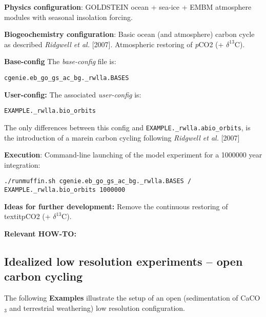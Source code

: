 \documentclass[10pt,twoside]{article}
\begin{document}
\noindent \textbf{Physics configuration}: GOLDSTEIN ocean + sea-ice + EMBM atmosphere modules with seasonal insolation forcing.

\noindent \textbf{Biogeochemistry configuration}: Basic ocean (and atmosphere) carbon cycle as described \textit{Ridgwell et al.} [2007]. Atmospheric restoring of \textit{p}CO2 (+ $\delta^{13}$C).

\noindent \textbf{Base-config} The \textit{base-config} file is:
\vspace{-10pt}\begin{verbatim}cgenie.eb_go_gs_ac_bg._rwlla.BASES\end{verbatim}\vspace{-10pt}

\noindent \textbf{User-config:} The associated \textit{user-config} is:
\vspace{-10pt}\begin{verbatim}EXAMPLE._rwlla.bio_orbits\end{verbatim}\vspace{-10pt}
The only differences between this config and \texttt{EXAMPLE.\_rwlla.abio\_orbits}, is the introduction of a marein carbon cycling following \textit{Ridgwell et al.} [2007]

\noindent \textbf{Execution}: Command-line launching of the model experiment for a 1000000 year integration:
\vspace{-10pt}\begin{verbatim}./runmuffin.sh cgenie.eb_go_gs_ac_bg._rwlla.BASES /
EXAMPLE._rwlla.bio_orbits 1000000\end{verbatim}\vspace{-10pt}

\noindent \textbf{Ideas for further development:} 
Remove the continuous restoring of textit{p}CO2 (+ $\delta^{13}$C).

\noindent \textbf{Relevant HOW-TO:} 


\subsection{Idealized low resolution experiments -- open carbon cycling}

The following \textbf{Examples} illustrate the setup of an open (sedimentation of CaCO\(_{3}\) and terrestrial weathering) low resolution configuration.
\end{document}
